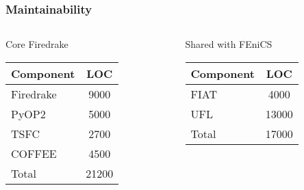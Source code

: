 \documentclass[presentation]{beamer}
\begin{document}
\begin{frame}
  \frametitle{Maintainability}
  \begin{columns}
    \begin{column}[t]{0.5\textwidth}
      \begin{block}{Core Firedrake}
        \begin{table}
          \centering
          \begin{tabular}{lc}
            Component & LOC \\
            \hline
            Firedrake & 9000 \\
            PyOP2     & 5000 \\
            TSFC      & 2700 \\
            COFFEE    & 4500 \\
            \hline
            Total     & 21200
          \end{tabular}
        \end{table}
      \end{block}
    \end{column}
    \begin{column}[t]{0.5\textwidth}
      \begin{block}{Shared with FEniCS}
        \begin{table}
          \centering
          \begin{tabular}{lc}
            Component & LOC \\
            \hline
            FIAT & 4000 \\
            UFL     & 13000 \\
            \hline
            Total & 17000
          \end{tabular}
        \end{table}        
      \end{block}
    \end{column}
  \end{columns}
\end{frame}
\end{document}
